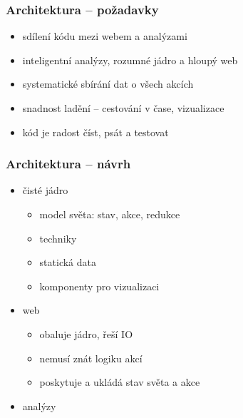 \documentclass[xcolor=dvipsnames, 14pt]{beamer}
\begin{document}
\begin{frame}
\frametitle{Architektura -- požadavky}
\begin{itemize}
\item sdílení kódu mezi webem a analýzami
\item inteligentní analýzy, rozumné jádro a hloupý web
\item systematické sbírání dat o všech akcích
\item snadnost ladění -- cestování v čase, vizualizace
\item kód je radost číst, psát a testovat %
\end{itemize}
\end{frame}

\begin{frame}
\frametitle{Architektura -- návrh}
\begin{itemize}
\item čisté jádro
  \begin{itemize}
  \item model světa: stav, akce, redukce
  \item techniky
  \item statická data
  \item komponenty pro vizualizaci
  \end{itemize}
\item web  %
  \begin{itemize}
  \item obaluje jádro, řeší IO
  \item nemusí znát logiku akcí
  \item poskytuje a ukládá stav světa a akce
  \end{itemize}
\item analýzy
\end{itemize}
\end{frame}
\end{document}
